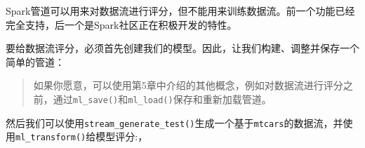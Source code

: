 \documentclass[
]{article}
\newenvironment{Shaded}{\begin{snugshade}}{\end{snugshade}}
\newcommand{\DecValTok}[1]{\textcolor[rgb]{0.00,0.00,0.81}{#1}}
\newcommand{\KeywordTok}[1]{\textcolor[rgb]{0.13,0.29,0.53}{\textbf{#1}}}
\newcommand{\NormalTok}[1]{#1}
\newcommand{\OperatorTok}[1]{\textcolor[rgb]{0.81,0.36,0.00}{\textbf{#1}}}
\newcommand{\StringTok}[1]{\textcolor[rgb]{0.31,0.60,0.02}{#1}}
\begin{document}
Spark管道可以用来对数据流进行评分，但不能用来训练数据流。前一个功能已经完全支持，后一个是Spark社区正在积极开发的特性。

要给数据流评分，必须首先创建我们的模型。因此，让我们构建、调整并保存一个简单的管道：

\begin{Shaded}
\end{Shaded}

\begin{quote}
如果你愿意，可以使用第5章中介绍的其他概念，例如对数据流进行评分之前，通过\texttt{ml\_save()}和\texttt{ml\_load()}保存和重新加载管道。
\end{quote}

然后我们可以使用\texttt{stream\_generate\_test()}生成一个基于\texttt{mtcars}的数据流，并使用\texttt{ml\_transform()}给模型评分:，
\end{document}

